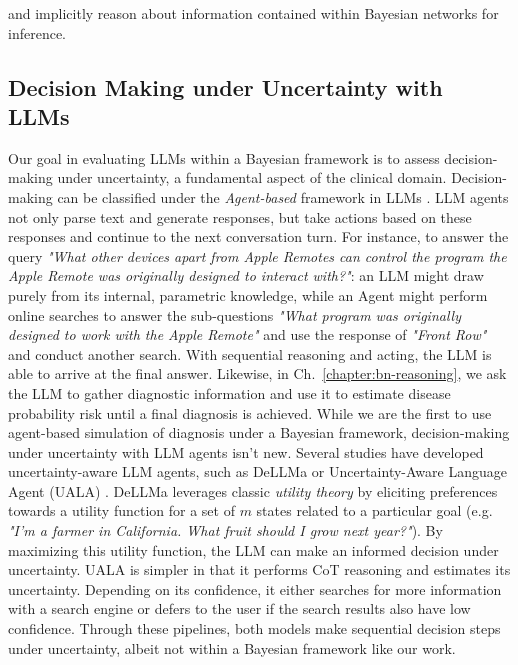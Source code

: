 and implicitly reason about information contained within Bayesian networks for inference. 

\subsection{Decision Making under Uncertainty with LLMs}
Our goal in evaluating LLMs within a Bayesian framework is to assess decision-making under uncertainty, a fundamental aspect of the clinical domain. Decision-making can be classified under the \emph{Agent-based} framework in LLMs \citep{yao2023react}. LLM agents not only parse text and generate responses, but take actions based on these responses and continue to the next conversation turn. For instance, to answer the query \emph{"What other devices apart from Apple Remotes can control the program the Apple Remote was originally designed to interact with?"}: an LLM might draw purely from its internal, parametric knowledge, while an Agent might perform online searches to answer the sub-questions \emph{"What program was originally designed to work with the Apple Remote"} and use the response of \emph{"Front Row"} and conduct another search. With sequential reasoning and acting, the LLM is able to arrive at the final answer. Likewise, in Ch.~\ref{chapter:bn-reasoning}, we ask the LLM to gather diagnostic information and use it to estimate disease probability risk until a final diagnosis is achieved. While we are the first to use agent-based simulation of diagnosis under a Bayesian framework, decision-making under uncertainty with LLM agents isn't new. Several studies have developed uncertainty-aware LLM agents, such as DeLLMa \citep{liuDeLLMaFrameworkDecision2024} or Uncertainty-Aware Language Agent (UALA) \citep{hanUncertaintyAwareLanguageAgent2024}. DeLLMa leverages classic \emph{utility theory} by eliciting preferences towards a utility function for a set of $m$ states related to a particular goal (e.g. \textit{"I'm a farmer in California. What fruit should I grow next year?"}). By maximizing this utility function, the LLM can make an informed decision under uncertainty. UALA is simpler in that it performs CoT reasoning and estimates its uncertainty. Depending on its confidence, it either searches for more information with a search engine or defers to the user if the search results also have low confidence. Through these pipelines, both models make sequential decision steps under uncertainty, albeit not within a Bayesian framework like our work. 

